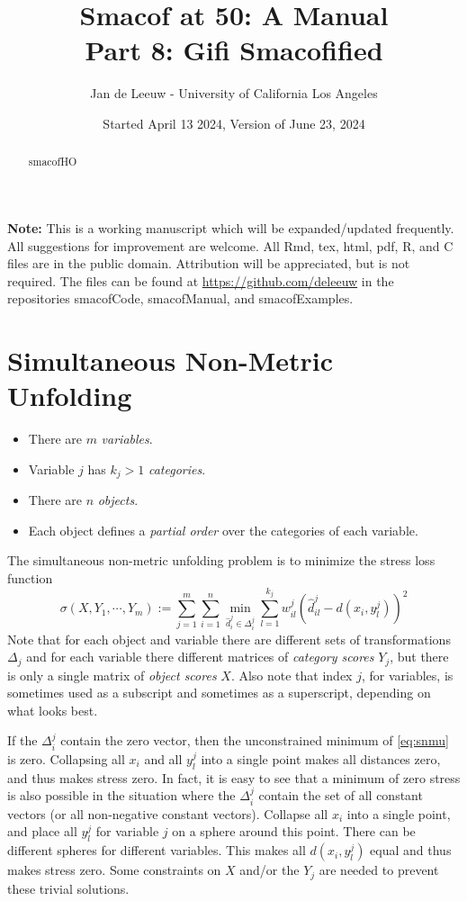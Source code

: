 \documentclass[
  12pt,
]{article}
\title{Smacof at 50: A Manual\\
Part 8: Gifi Smacofified}
\author{Jan de Leeuw - University of California Los Angeles}
\date{Started April 13 2024, Version of June 23, 2024}
\providecommand{\tightlist}{%
  \setlength{\itemsep}{0pt}\setlength{\parskip}{0pt}}
\begin{document}
\maketitle
\begin{abstract}
smacofHO
\end{abstract}

{
\setcounter{tocdepth}{3}
\tableofcontents
}
\textbf{Note:} This is a working manuscript which will be expanded/updated
frequently. All suggestions for improvement are welcome. All Rmd, tex,
html, pdf, R, and C files are in the public domain. Attribution will be
appreciated, but is not required. The files can be found at
\url{https://github.com/deleeuw} in the repositories smacofCode, smacofManual,
and smacofExamples.

\section{Simultaneous Non-Metric Unfolding}\label{snmu}

\begin{itemize}
\tightlist
\item
  There are \(m\) \emph{variables}.
\item
  Variable \(j\) has \(k_j>1\) \emph{categories}.
\item
  There are \(n\) \emph{objects}.
\item
  Each object defines a \emph{partial order} over the categories of each variable.
\end{itemize}

The simultaneous non-metric unfolding problem is to minimize the stress loss function
\begin{equation}
\sigma(X,Y_1,\cdots,Y_m):=\sum_{j=1}^m\sum_{i=1}^n\min_{\hat d_i^j\in\Delta_i^j}\sum_{l=1}^{k_j}w_{il}^j(\hat d_{il}^j-d(x_i,y_l^j))^2
\label{eq:snmu}
\end{equation}
Note that for each object and variable there are different sets of transformations \(\Delta_j\)
and for each variable there different matrices of \emph{category scores} \(Y_j\), but there is only a single matrix of \emph{object scores} \(X\). Also note that index \(j\), for variables, is sometimes used as a subscript and sometimes as a superscript, depending on what looks best.

If the \(\Delta_i^j\) contain the zero vector, then the unconstrained minimum of \eqref{eq:snmu} is zero. Collapsing all \(x_i\) and all \(y_l^j\) into a single point makes all distances zero, and thus makes stress zero. In fact, it is easy to see that a minimum of zero stress is also possible in the situation where the \(\Delta_i^j\) contain the set of all constant vectors (or all non-negative constant vectors). Collapse all
\(x_i\) into a single point, and place all \(y_l^j\) for variable \(j\) on a sphere around this point. There can be different spheres for different variables. This makes all \(d(x_i,y_l^j)\) equal and thus makes stress zero. Some constraints on \(X\) and/or the \(Y_j\) are needed to prevent these trivial solutions.
\end{document}
